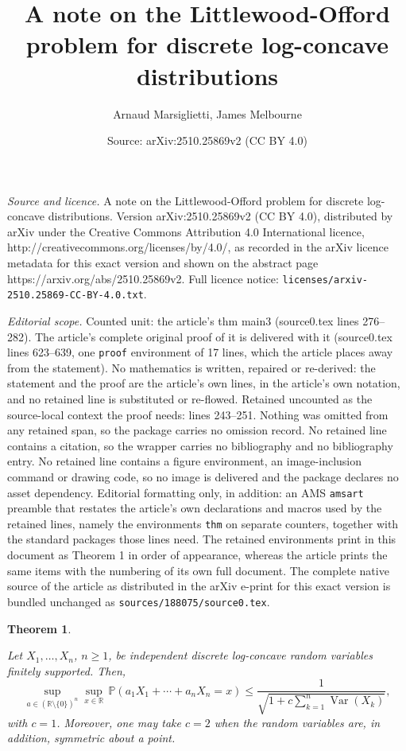 \documentclass[10pt,a4paper]{amsart}
\title{A note on the Littlewood-Offord problem for discrete log-concave distributions}
\author{Arnaud Marsiglietti, James Melbourne}
\date{Source: arXiv:2510.25869v2 (CC BY 4.0)}
\newtheorem{thm}{Theorem}
\newcommand{\Prob}{\mathbb{P}}
\newcommand{\R}{\mathbb{R}}
\DeclareMathOperator{\Var}{Var}
\begin{document}
\maketitle

\noindent\emph{Source and licence.} A note on the Littlewood-Offord problem for discrete log-concave distributions. Version arXiv:2510.25869v2 (CC BY 4.0), distributed by arXiv under the Creative Commons Attribution 4.0 International licence, http://creativecommons.org/licenses/by/4.0/, as recorded in the arXiv licence metadata for this exact version and shown on the abstract page https://arxiv.org/abs/2510.25869v2. Full licence notice: \texttt{licenses/arxiv-2510.25869-CC-BY-4.0.txt}.\par\smallskip

\noindent\textit{Editorial scope.} Counted unit: the article's thm main3 (source0.tex lines 276--282). The article's complete original proof of it is delivered with it (source0.tex lines 623--639, one \texttt{proof} environment of 17 lines, which the article places away from the statement). No mathematics is written, repaired or re-derived: the statement and the proof are the article's own lines, in the article's own notation, and no retained line is substituted or re-flowed.  Retained uncounted as the source-local context the proof needs: lines 243--251.  Nothing was omitted from any retained span, so the package carries no omission record.  No retained line contains a citation, so the wrapper carries no bibliography and no bibliography entry.  No retained line contains a figure environment, an image-inclusion command or drawing code, so no image is delivered and the package declares no asset dependency.  Editorial formatting only, in addition: an AMS \texttt{amsart} preamble that restates the article's own declarations and macros used by the retained lines, namely the environments \texttt{thm} on separate counters, together with the standard packages those lines need.  The retained environments print in this document as Theorem 1 in order of appearance, whereas the article prints the same items with the numbering of its own full document.  The complete native source of the article as distributed in the arXiv e-print for this exact version is bundled unchanged as \texttt{sources/188075/source0.tex}.
\begin{thm}\label{main1}

Let $X_1, \dots, X_n$, $n \geq 1$, be independent discrete log-concave random variables finitely supported. Then,
\begin{equation}\label{1}
\sup_{a \in (\R \setminus \{0\})^n} \sup_{x \in \R} \, \Prob(a_1 X_1 + \cdots + a_n X_n = x) \leq \frac{1}{\sqrt{1 + c \sum_{k=1}^n \Var(X_k)}},
\end{equation}
with $c=1$. Moreover, one may take $c = 2$ when the random variables are, in addition, symmetric about a point.

\end{thm}
\end{document}
